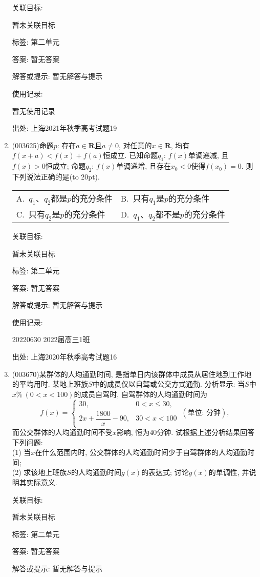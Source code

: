 \documentclass[10pt,a4paper]{article}
\newcommand{\bracket}[1]{(\hbox to #1pt{})}
\newcommand{\twoch}[4]{\par\begin{tabular}{p{.46\textwidth}p{.46\textwidth}}
A.~#1& B.~#2\\
C.~#3& D.~#4
\end{tabular}}
\begin{document}
\begin{enumerate}[1.]
关联目标:

暂未关联目标



标签: 第二单元

答案: 暂无答案

解答或提示: 暂无解答与提示

使用记录:

暂无使用记录


出处: 上海2021年秋季高考试题19
\item { (003625)}命题$p$: 存在$a\in \mathbf{R}$且$a\ne 0$, 对任意的$x\in \mathbf{R}$, 均有$f(x+a)<f(x)+f(a)$恒成立. 已知命题$q_1$: $f(x)$单调递减, 且$f(x)>0$恒成立; 命题$q_2$: $f(x)$单调递增, 且存在${x_0}<0$使得$f({x_0})=0$. 则下列说法正确的是\bracket{20}.
\twoch{$q_1$、$q_2$都是$p$的充分条件}{只有$q_1$是$p$的充分条件}{只有$q_2$是$p$的充分条件}{$q_1$、$q_2$都不是$p$的充分条件}


关联目标:

暂未关联目标



标签: 第二单元

答案: 暂无答案

解答或提示: 暂无解答与提示

使用记录:

20220630	2022届高三1班	


出处: 上海2020年秋季高考试题16
\item { (003670)}某群体的人均通勤时间, 是指单日内该群体中成员从居住地到工作地的平均用时. 某地上班族$S$中的成员仅以自驾或公交方式通勤. 分析显示: 当$S$中$x\% \ (0<x<100)$的成员自驾时, 自驾群体的人均通勤时间为
$$f(x)=\begin{cases}
30, & 0<x \le 30,\\ 2x+\dfrac{1800}{x}-90, & 30<x<100\end{cases} \ (\text{单位: 分钟}),$$
而公交群体的人均通勤时间不受$x$影响, 恒为$40$分钟. 试根据上述分析结果回答下列问题:\\
(1) 当$x$在什么范围内时, 公交群体的人均通勤时间少于自驾群体的人均通勤时间;\\
(2) 求该地上班族$S$的人均通勤时间$g(x)$的表达式; 讨论$g(x)$的单调性, 并说明其实际意义.


关联目标:

暂未关联目标



标签: 第二单元

答案: 暂无答案

解答或提示: 暂无解答与提示


\end{enumerate}
\end{document}
